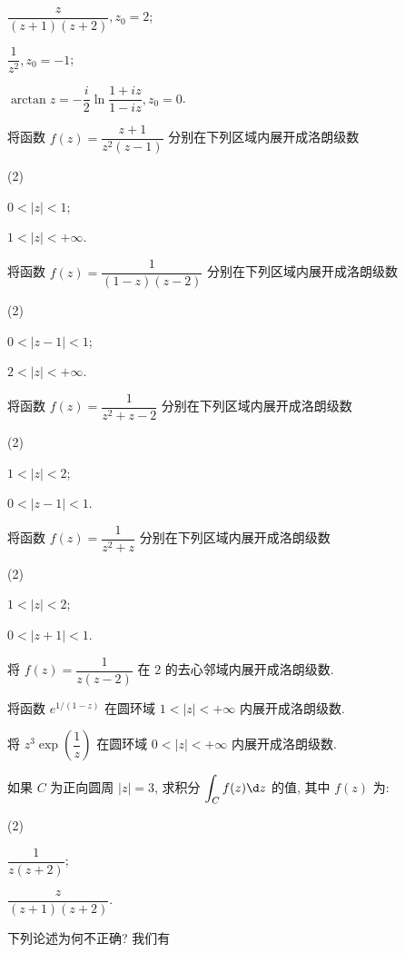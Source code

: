 \begin{homework}
\begin{subex}
\begin{subsubex}
			\item $\dfrac{z}{(z+1)(z+2)}, z_0=2$;
			\item $\dfrac1{z^2}, z_0=-1$;
			\item $\arctan z=−\dfrac i2\ln\dfrac{1+iz}{1-iz}, z_0=0$.
		\end{subsubex}
		\item 将函数 $f(z)=\dfrac{z+1}{z^2(z-1)}$ 分别在下列区域内展开成洛朗级数
			\begin{subsubex}(2)
				\item $0<|z|<1$;
				\item $1<|z|<+\infty$.
			\end{subsubex}
		\item 将函数 $f(z)=\dfrac1{(1-z)(z-2)}$ 分别在下列区域内展开成洛朗级数
			\begin{subsubex}(2)
				\item $0<|z-1|<1$;
				\item $2<|z|<+\infty$.
			\end{subsubex}
		\item 将函数 $f(z)=\dfrac1{z^2+z-2}$ 分别在下列区域内展开成洛朗级数
			\begin{subsubex}(2)
				\item $1<|z|<2$;
				\item $0<|z-1|<1$.
			\end{subsubex}
		\item 将函数 $f(z)=\dfrac1{z^2+z}$ 分别在下列区域内展开成洛朗级数
			\begin{subsubex}(2)
				\item $1<|z|<2$;
				\item $0<|z+1|<1$.
			\end{subsubex}
		\item 将 $f(z)=\dfrac1{z(z-2)}$ 在 $2$ 的去心邻域内展开成洛朗级数.
		\item 将函数 $e^{1/(1-z)}$ 在圆环域 $1<|z|<+\infty$ 内展开成洛朗级数.
		\item 将 $z^3\exp\left(\dfrac1z\right)$ 在圆环域 $0<|z|<+\infty$ 内展开成洛朗级数.
		\item 如果 $C$ 为正向圆周 $|z|=3$, 求积分 $\displaystyle\int_Cf(z)\d z$ 的值, 其中 $f(z)$ 为:
			\begin{subsubex}(2)
				\item $\dfrac1{z(z+2)}$;
				\item $\dfrac{z}{(z+1)(z+2)}$.
			\end{subsubex}
		\item 下列论述为何不正确? 我们有
			\begin{align*}

\end{align*}
\end{subex}
\end{homework}
